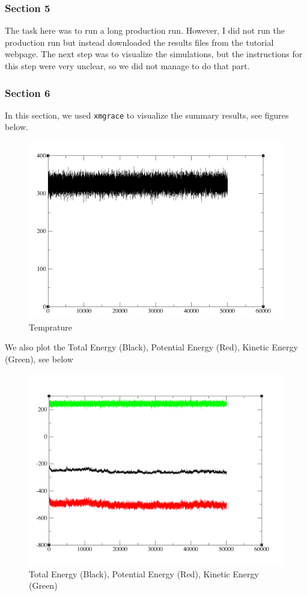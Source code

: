 \documentclass[11pt]{article}
\makeatletter
\def\maxwidth{\ifdim\Gin@nat@width>\linewidth\linewidth
    \else\Gin@nat@width\fi}
\let\Oldincludegraphics\includegraphics
\renewcommand{\includegraphics}[1]{\Oldincludegraphics[width=.8\maxwidth]{#1}}
\makeatother
\begin{document}
\subsubsection{Section 5}\label{section-5}

The task here was to run a long production run. However, I did not run
the production run but instead downloaded the results files from the
tutorial webpage. The next step was to visualize the simulations, but
the instructions for this step were very unclear, so we did not manage
to do that part.

\subsubsection{Section 6}\label{section-6}

In this section, we used \texttt{xmgrace} to visualize the summary
results, see figures below.

\begin{figure}
\centering
\includegraphics{Screenshot_temp.png}
\caption{Temprature}
\end{figure}

We also plot the Total Energy (Black), Potential Energy (Red), Kinetic
Energy (Green), see below

\begin{figure}
\centering
\includegraphics{Screenshot_energy.png}
\caption{Total Energy (Black), Potential Energy (Red), Kinetic Energy
(Green)}
\end{figure}
\end{document}
